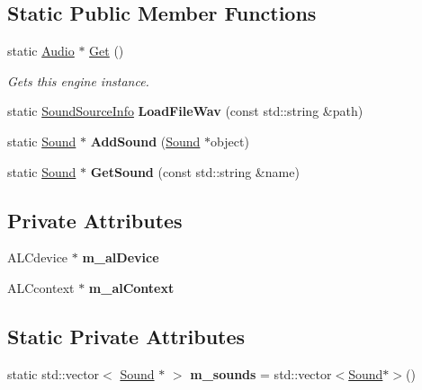 \subsection*{Static Public Member Functions}
\begin{DoxyCompactItemize}
\item 
static \hyperlink{class_flounder_1_1_audio}{Audio} $\ast$ \hyperlink{class_flounder_1_1_audio_a4432ad49cca82937039c9ade8c3ce54a}{Get} ()
\begin{DoxyCompactList}\small\item\em Gets this engine instance. \end{DoxyCompactList}\item 
\mbox{\label{class_flounder_1_1_audio_af049aa9bbe21255b7d38aee73f7fbdc6}} 
static \hyperlink{struct_flounder_1_1_sound_source_info}{Sound\+Source\+Info} {\bfseries Load\+File\+Wav} (const std\+::string \&path)
\item 
\mbox{\label{class_flounder_1_1_audio_a099bf57b4d461ffe2e1506169175a64a}} 
static \hyperlink{class_flounder_1_1_sound}{Sound} $\ast$ {\bfseries Add\+Sound} (\hyperlink{class_flounder_1_1_sound}{Sound} $\ast$object)
\item 
\mbox{\label{class_flounder_1_1_audio_a94734ec632d7ef51888257d661ffac52}} 
static \hyperlink{class_flounder_1_1_sound}{Sound} $\ast$ {\bfseries Get\+Sound} (const std\+::string \&name)
\end{DoxyCompactItemize}
\subsection*{Private Attributes}
\begin{DoxyCompactItemize}
\item 
\mbox{\label{class_flounder_1_1_audio_a4345528c114163025e322d81a4decf3d}} 
A\+L\+Cdevice $\ast$ {\bfseries m\+\_\+al\+Device}
\item 
\mbox{\label{class_flounder_1_1_audio_a527e706838d1259270f6ad1566f77cd3}} 
A\+L\+Ccontext $\ast$ {\bfseries m\+\_\+al\+Context}
\end{DoxyCompactItemize}
\subsection*{Static Private Attributes}
\begin{DoxyCompactItemize}
\item 
\mbox{\label{class_flounder_1_1_audio_a718965fb597f38334f772a245fcd0e0f}} 
static std\+::vector$<$ \hyperlink{class_flounder_1_1_sound}{Sound} $\ast$ $>$ {\bfseries m\+\_\+sounds} = std\+::vector$<$\hyperlink{class_flounder_1_1_sound}{Sound}$\ast$$>$()
\end{DoxyCompactItemize}
